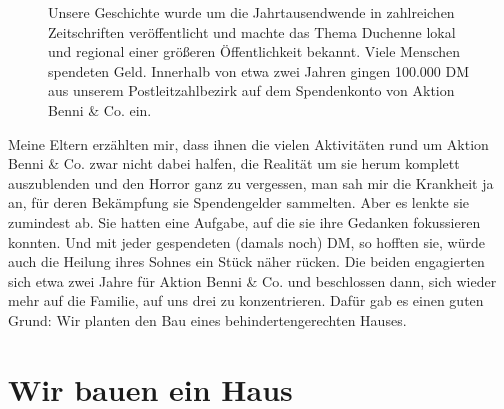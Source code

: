 \documentclass[fontsize=14pt,a4paper,headinclude,DIV=calc,automark]{scrbook}
\begin{document}
\setlength{\fboxsep}{0pt}    %
\setlength{\fboxrule}{0.2pt} %
\begin{figure}[ht]
    \centering
    \caption{Unsere Geschichte wurde um die Jahrtausendwende in zahlreichen Zeitschriften veröffentlicht und machte das Thema Duchenne lokal und regional einer größeren Öffentlichkeit bekannt. Viele Menschen spendeten Geld. Innerhalb von etwa zwei Jahren gingen 100.000 DM aus unserem Postleitzahlbezirk auf dem Spendenkonto von Aktion Benni \& Co. ein.}
    \label{fig:zeitungsausschnitte}
\end{figure}

Meine Eltern erzählten mir, dass ihnen die vielen Aktivitäten rund um Aktion Benni \& Co. zwar nicht dabei halfen, die Realität um sie herum komplett auszublenden und den Horror ganz zu vergessen, man sah mir die Krankheit ja an, für deren Bekämpfung sie Spendengelder sammelten. Aber es lenkte sie zumindest ab. Sie hatten eine Aufgabe, auf die sie ihre Gedanken fokussieren konnten. Und mit jeder gespendeten (damals noch) DM, so hofften sie, würde auch die Heilung ihres Sohnes ein Stück näher rücken. Die beiden engagierten sich etwa zwei Jahre für Aktion Benni \& Co. und beschlossen dann, sich wieder mehr auf die Familie, auf uns drei zu konzentrieren. Dafür gab es einen guten Grund: Wir planten den Bau eines behindertengerechten Hauses.

\section{Wir bauen ein Haus}
\end{document}
